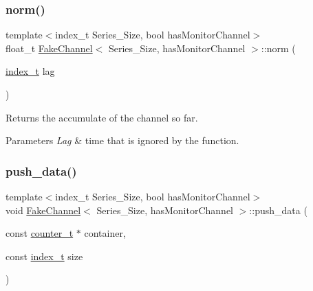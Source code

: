 \mbox{\label{classFakeChannel_a2c7edb717127d703f71e50df8a0b391c}} 
\subsubsection{\texorpdfstring{norm()}{norm()}}
{\footnotesize\ttfamily template$<$index\+\_\+t Series\+\_\+\+Size, bool has\+Monitor\+Channel$>$ \\
float\+\_\+t \hyperlink{classFakeChannel}{Fake\+Channel}$<$ Series\+\_\+\+Size, has\+Monitor\+Channel $>$\+::norm (\begin{DoxyParamCaption}\item[{\hyperlink{types_8hpp_ab41b824af8e088d090c0b9e60f536c9d}{index\+\_\+t}}]{lag }\end{DoxyParamCaption})\hspace{0.3cm}{\ttfamily [inline]}}



Returns the accumulate of the channel so far. 


\begin{DoxyParams}{Parameters}
{\em Lag} & time that is ignored by the function. \\
\hline
\end{DoxyParams}
\mbox{\label{classFakeChannel_a0b367e4109f7143261f44e5fde277181}} 
\subsubsection{\texorpdfstring{push\+\_\+data()}{push\_data()}}
{\footnotesize\ttfamily template$<$index\+\_\+t Series\+\_\+\+Size, bool has\+Monitor\+Channel$>$ \\
void \hyperlink{classFakeChannel}{Fake\+Channel}$<$ Series\+\_\+\+Size, has\+Monitor\+Channel $>$\+::push\+\_\+data (\begin{DoxyParamCaption}\item[{const \hyperlink{types_8hpp_a22f279793847eba127de149437848c48}{counter\+\_\+t} $\ast$}]{container,  }\item[{const \hyperlink{types_8hpp_ab41b824af8e088d090c0b9e60f536c9d}{index\+\_\+t}}]{size }\end{DoxyParamCaption})\hspace{0.3cm}{\ttfamily [inline]}}



